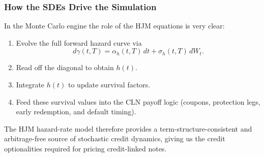 \subsubsection*{How the SDEs Drive the Simulation}

In the Monte Carlo engine the role of the HJM equations is very clear:
\begin{enumerate}
    \item Evolve the full forward hazard curve via
          \[
          d\gamma(t,T) = \alpha_h(t,T)\,dt + \sigma_h(t,T)\,dW_t.
          \]
    \item Read off the diagonal to obtain $h(t)$.
    \item Integrate $h(t)$ to update survival factors.
    \item Feed these survival values into the CLN payoff logic (coupons,
          protection legs, early redemption, and default timing).
\end{enumerate}

The HJM hazard-rate model therefore provides a term-structure-consistent and
arbitrage-free source of stochastic credit dynamics, giving us the credit
optionalities required for pricing credit-linked notes.
